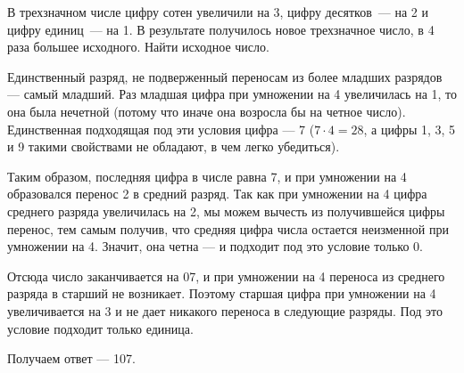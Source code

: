 \begin{itemize}

	\itB В трехзначном числе цифру сотен увеличили на 3, цифру десятков~— на 2 и цифру единиц~— на 1. В результате получилось новое трехзначное число, в 4 раза большее исходного. Найти исходное число.
	
	\itr Единственный разряд, не подверженный переносам из более младших разрядов — самый младший. Раз младшая цифра при умножении на 4 увеличилась на 1, то она была нечетной (потому что иначе она возросла бы на четное число). Единственная подходящая под эти условия цифра — 7 ($7 \cdot 4 = 28$, а цифры 1, 3, 5 и 9 такими свойствами не обладают, в чем легко убедиться).
	
	Таким образом, последняя цифра в числе равна 7, и при умножении на 4 образовался перенос 2 в средний разряд. Так как при умножении на 4 цифра среднего разряда увеличилась на 2, мы можем вычесть из получившейся цифры перенос, тем самым получив, что средняя цифра числа остается неизменной при умножении на 4. Значит, она четна — и подходит под это условие только 0.
	
	Отсюда число заканчивается на 07, и при умножении на 4 переноса из среднего разряда в старший не возникает. Поэтому старшая цифра при умножении на 4 увеличивается на 3 и не дает никакого переноса в следующие разряды. Под это условие подходит только единица.
	
	Получаем ответ — 107.

\end{itemize}